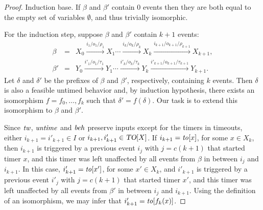 \begin{proof}
Induction base. If $\beta$ and $\beta'$ contain $0$ events then they are both equal to the empty set of variables $\emptyset$,
and thus trivially isomorphic.

For the induction step, suppose $\beta$ and $\beta'$ contain $k+1$ events:
\begin{eqnarray*}
\beta & = & X_0 \xrightarrow{i_1/o_1/\rho_1} X_1 \cdots \xrightarrow{i_k/o_k/\rho_k} X_{k}
 \xrightarrow{i_{k+1}/o_{k+1}/\rho_{k+1}} X_{k+1},\\
\beta' & = & Y_0 \xrightarrow{i'_1/o_1/\tau_1} Y_1  \cdots \xrightarrow{i'_k/o_k/\tau_k} Y_{k} 
 \xrightarrow{i'_{k+1}/o_{k+1}/\tau_{k+1}} Y_{k+1}.
\end{eqnarray*}
Let $\delta$ and $\delta'$ be the prefixes of $\beta$ and $\beta'$, respectively,
containing $k$ events. Then $\delta$ is also a feasible untimed behavior and, by
induction hypothesis, there exists an isomorphism $f = f_0 ,\ldots, f_k$ such that $\delta' = f(\delta)$.
Our task is to extend this isomorphism to $\beta$ and $\beta'$.

Since $\mathit{tw}$, $\mathit{untime}$ and $\mathit{beh}$ preserve inputs except for the timers in timeouts,
either $i_{k+1} = i'_{k+1} \in I$ or $i_{k+1}, i'_{k+1} \in\mbox{\sl TO}[X]$.
If $i_{k+1} = \mathit{to}[x]$, for some $x \in X_k$, then $i_{k+1}$ is triggered by a previous event $i_j$ with $j=c(k+1)$ that started
timer $x$, and this timer was left unaffected by all events from $\beta$ in between $i_j$ and $i_{k+1}$. In this case,
$i'_{k+1} = \mathit{to}[x']$, for some $x' \in X_k$, and $i'_{k+1}$ is triggered by a previous event $i'_j$ with $j=c(k+1)$ that started
timer $x'$, and this timer was left unaffected by all events from $\beta'$ in between $i_j$ and $i_{k+1}$.
Using the definition of an isomorphism, we may infer that $i'_{k+1} = \mathit{to}[f_k(x)]$.


\end{proof}
